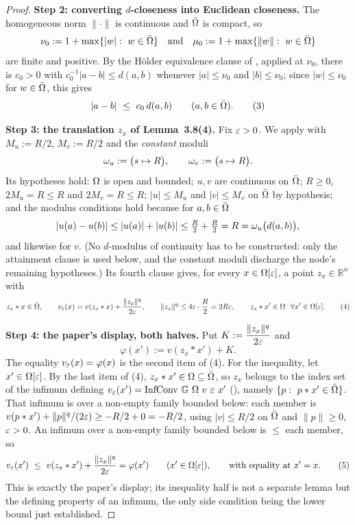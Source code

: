 \begin{proof}
\medskip\noindent\textbf{Step 2: converting $d$-closeness into Euclidean closeness.} The
homogeneous norm $\|\cdot\|$ is continuous and $\bar{\Omega}$ is compact, so
\[
 \nu_0:=1+\max\{|w|:\ w\in\bar\Om\}\quad\text{and}\quad
 \mu_0:=1+\max\{\|w\|:\ w\in\bar\Om\}
\]
are finite and positive. By the Hölder equivalence clause of , applied
at $\nu_0$, there is $c_0>0$ with $c_0^{-1}|a-b|\le d(a,b)$ whenever $|a|\le\nu_0$ and
$|b|\le\nu_0$; since $|w|\le\nu_0$ for $w\in\bar{\Omega}$, this gives
\[
 |a-b|\ \le\ c_0\,d(a,b)\qquad(a,b\in\bar{\Omega}). \tag{3}
\]

\medskip\noindent\textbf{Step 3: the translation $z_x$ of Lemma~3.8(4).} Fix $\varepsilon>0$. We
apply  with $M_u:=R/2$, $M_v:=R/2$ and the \emph{constant} moduli
\[
 \omega_u:=\big(s\mapsto R\big),\qquad \omega_v:=\big(s\mapsto R\big).
\]
Its hypotheses hold: $\Omega$ is open and bounded; $u,v$ are continuous on $\bar{\Omega}$;
$R\ge0$, $2M_u=R\le R$ and $2M_v=R\le R$; $|u|\le M_u$ and $|v|\le M_v$ on $\bar{\Omega}$ by
hypothesis; and the modulus conditions hold because for $a,b\in\bar{\Omega}$
\[
 |u(a)-u(b)|\le|u(a)|+|u(b)|\le \tfrac R2+\tfrac R2=R=\omega_u\big(d(a,b)\big),
\]
and likewise for $v$. (No $d$-modulus of continuity has to be constructed: only the
attainment clause is used below, and the constant moduli discharge the node's remaining
hypotheses.) Its fourth clause gives, for every $x\in\Omega[\varepsilon]$, a point
$z_x\in\mathbb R^{n}$ with
\[
 z_x*x\in\bar{\Omega},\qquad
 v_{\varepsilon}(x)=v(z_x*x)+\frac{\|z_x\|^{q}}{2\varepsilon},\qquad
 \|z_x\|^{q}\le4\varepsilon\cdot\frac R2=2R\varepsilon,\qquad
 z_x*x'\in\Omega\ \ \forall x'\in\Omega[\varepsilon]. \tag{4}
\]

\medskip\noindent\textbf{Step 4: the paper's display, both halves.} Put
$K:=\dfrac{\|z_x\|^{q}}{2\varepsilon}$ and
\[
 \varphi(x'):=v(z_x*x')+K .
\]
The equality $v_\varepsilon(x)=\varphi(x)$ is the second item of (4). For the inequality, let
$x'\in\Omega[\varepsilon]$. By the last item of (4), $z_x*x'\in\Omega\subseteq\bar{\Omega}$, so
$z_x$ belongs to the index set of the infimum defining
$v_{\eps}(x')=\mathrm{InfConv}\ \mathbb G\ \Om\ v\ \eps\ x'$ (), namely
$\{p:\ p*x'\in\bar\Om\}$. That infimum is over a non-empty family bounded below: each member
is $v(p*x')+\|p\|^{q}/(2\varepsilon)\ge-R/2+0=-R/2$, using $|v|\le R/2$ on $\bar{\Omega}$ and
$\|p\|\ge0$, $\varepsilon>0$. An infimum over a non-empty family bounded below is $\le$ each
member, so
\[
 v_{\eps}(x')\ \le\ v(z_x*x')+\frac{\|z_x\|^{q}}{2\eps}=\varphi(x')\qquad(x'\in\Om[\eps]),
 \qquad\text{with equality at } x'=x. \tag{5}
\]
This is exactly the paper's display; its inequality half is not a separate lemma but the
defining property of an infimum, the only side condition being the lower bound just
established.


\end{proof}
